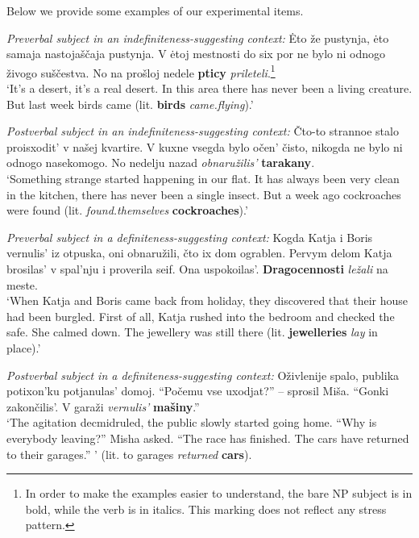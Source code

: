 \documentclass[output=paper]{langsci/langscibook}
\begin{document}
Below we provide some examples of our experimental items. 

\begin{exe}
\ex\label{2ex:14}
{\emph{Preverbal subject in an indefiniteness-suggesting context:}}
\exi{}
{
Ėto \v{z}e pustynja, ėto samaja nastoja\v{s}\v{c}aja pustynja. 
V ėtoj mestnosti do six por ne bylo ni odnogo \v{z}ivogo su\v{s}\v{c}estva. 
No na pro\v{s}loj nedele {\bf{pticy}} {\emph{prileteli}}}.\footnote{In order to make the examples easier to understand, the bare NP subject is in bold, while the verb is in italics. This marking does not reflect any stress pattern.}\\
`It's a desert, it's a real desert. In this area there has never been a living creature. But last week birds came (lit. {\bf{birds}} {\emph{came.flying}}).'

\ex\label{2ex:15}
{\emph{Postverbal subject in an indefiniteness-suggesting context:}}
\exi{}
\v{C}to-to strannoe stalo proisxodit' v na\v{s}ej kvartire. 
V kuxne vsegda bylo o\v{c}en' \v{c}isto, nikogda ne bylo ni odnogo nasekomogo. 
No nedelju nazad {\emph{obnaru\v{z}ilis'}} {\bf{tarakany}}. \\
`Something strange started happening in our flat. It has always been very clean in the kitchen, there has never been a single insect. But a week ago cockroaches were found (lit. {\emph{found.themselves}} {\bf{cockroaches}}).'

\ex\label{2ex:16}
{\emph{Preverbal subject in a definiteness-suggesting context:}}
\exi{}
Kogda Katja i Boris vernulis' iz otpuska, oni obnaru\v{z}ili, \v{c}to ix dom ograblen. 
Pervym delom Katja brosilas' v spal'nju i proverila seif. 
Ona uspokoilas'. 
{\bf{Dragocennosti}} {\emph{le\v{z}ali}} na meste. \\
`When Katja and Boris came back from holiday, they discovered that their house had been burgled. First of all, Katja rushed into the bedroom and checked the safe. She calmed down. The jewellery was still there (lit. {\bf{jewelleries}} {\emph{lay}} in place).'

\filbreak
\ex\label{2ex:17}
{\emph{Postverbal subject in a definiteness-suggesting context:}}
\exi{}
O\v{z}ivlenije spalo, publika potixon'ku potjanulas' domoj. 
``Po\v{c}emu vse uxodjat?'' -- sprosil Mi\v{s}a. 
``Gonki zakon\v{c}ilis'. V gara\v{z}i {\emph{vernulis'}} {\bf{ma\v{s}iny}}.'' \\
`The agitation decmidruled, the public slowly started going home. ``Why is everybody leaving?'' Misha asked. ``The race has finished. The cars have returned to their garages.'' ' (lit. to garages {\emph{returned}} {\bf{cars}}).
\end{exe}
\end{document}
